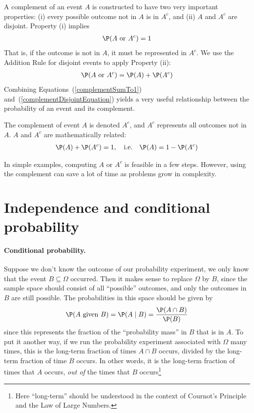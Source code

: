 A complement of an event $A$ is constructed to have two very important properties: (i) every possible outcome not in $A$ is in $A^c$, and (ii) $A$ and $A^c$ are disjoint. Property (i) implies
\begin{eqnarray}
\P(A\text{ or }A^c) = 1
\label{complementSumTo1}
\end{eqnarray}
That is, if the outcome is not in $A$, it must be represented in $A^c$. We use the Addition Rule for disjoint events to apply Property (ii):
\begin{eqnarray}
\P(A\text{ or }A^c) = \P(A) + \P(A^c)
\label{complementDisjointEquation}
\end{eqnarray}
Combining Equations~(\ref{complementSumTo1}) and~(\ref{complementDisjointEquation}) yields a very useful relationship between the probability of an event and its complement.

\begin{termBox}{
The complement of event $A$ is denoted $A^c$, and $A^c$ represents all outcomes not in~$A$. $A$ and $A^c$ are mathematically related: \vspace{-2mm}
\begin{eqnarray}\label{complement}
\P(A) + \P(A^c) = 1, \quad\text{i.e.}\quad \P(A) = 1-\P(A^c)
\end{eqnarray}\vspace{-6.5mm}}
\end{termBox}

In simple examples, computing $A$ or $A^c$ is feasible in a few steps. However, using the complement can save a lot of time as problems grow in complexity.


\section{Independence and conditional probability}
\label{probabilityIndependence}

\label{conditionalProbabilitySection}
\paragraph{Conditional probability.}
Suppose we don't know the outcome of our probability experiment, we only know that the event $B\subseteq\Omega$ occurred.
Then it makes sense to replace $\Omega$ by $B$, since the sample space should consist of all ``possible'' outcomes, and only the outcomes in $B$ are still possible.
The probabilities in this space should be given by
\[
	\P(A\text{ given }B) = \P(A\mid B) = \frac{\P(A\cap B)}{\P(B)}
\]
since this represents the fraction of the ``probability mass'' in $B$ that is in $A$. To put it another way, if we run the probability experiment associated with $\Omega$ many times, this is the long-term fraction of times $A\cap B$ occurs, divided by the long-term fraction of time $B$ occurs. In other words, it is the long-term fraction of times that $A$ occurs, \emph{out of} the times that $B$ occurs\footnote{Here ``long-term'' should be understood in the context of Cournot's Principle and the Law of Large Numbers.}

